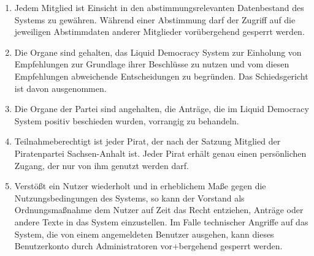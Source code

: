 \begin{enumerate}
\item Jedem Mitglied ist Einsicht in den abstimmungsrelevanten Datenbestand des
Systems zu gewähren. Während einer Abstimmung darf der Zugriff auf die
jeweiligen Abstimmdaten anderer Mitglieder vorübergehend gesperrt werden.

\item Die Organe sind gehalten, das Liquid Democracy System zur Einholung von
Empfehlungen zur Grundlage ihrer Beschlüsse zu nutzen und vom diesen
Empfehlungen abweichende Entscheidungen zu begründen. Das Schiedsgericht ist
davon ausgenommen.

\item Die Organe der Partei sind angehalten, die Anträge, die im Liquid
Democracy System positiv beschieden wurden, vorrangig zu behandeln.

\item Teilnahmeberechtigt ist jeder Pirat, der nach der Satzung Mitglied der
Piratenpartei Sachsen-Anhalt ist. Jeder Pirat erhält genau einen persönlichen
Zugang, der nur von ihm genutzt werden darf.

\item Verstößt ein Nutzer wiederholt und in erheblichem Maße gegen die
Nutzungsbedingungen des Systems, so kann der Vorstand als Ordnungsmaßnahme dem
Nutzer auf Zeit das Recht entziehen, Anträge oder andere Texte in das System
einzustellen. Im Falle technischer Angriffe auf das System, die von einem
angemeldeten Benutzer ausgehen, kann dieses Benutzerkonto durch Administratoren
vor+bergehend gesperrt werden.
\end{enumerate}